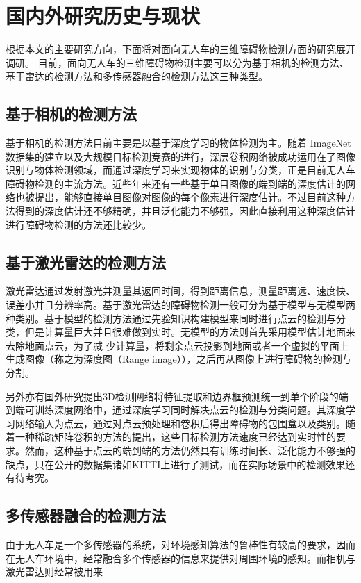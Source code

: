 \section{国内外研究历史与现状}
根据本文的主要研究方向，下面将对面向无人车的三维障碍物检测方面的研究展开调研。
目前，面向无人车的三维障碍物检测主要可以分为基于相机的检测方法、基于雷达的检测方法和多传感器融合的检测方法这三种类型。
\subsection{基于相机的检测方法}
基于相机的检测方法目前主要是以基于深度学习的物体检测为主。随着 ImageNet数据集的建立以及大规模目标检测竞赛的进行，深层卷积网络被成功运用在了图像识别与物体检测领域，而通过深度学习来实现物体的识别与分类，正是目前无人车障碍物检测的主流方法。近些年来还有一些基于单目图像的端到端的深度估计的网络也被提出，能够直接单目图像对图像的每个像素进行深度估计。不过目前这种方法得到的深度估计还不够精确，并且泛化能力不够强，因此直接利用这种深度估计进行障碍物检测的方法还比较少。
\subsection{基于激光雷达的检测方法}
激光雷达通过发射激光并测量其返回时间，得到距离信息，测量距离远、速度快、误差小并且分辨率高。基于激光雷达的障碍物检测一般可分为基于模型与无模型两种类别。基于模型的检测方法通过先验知识构建模型来同时进行点云的检测与分类，但是计算量巨大并且很难做到实时。无模型的方法则首先采用模型估计地面来去除地面点云，为了减 少计算量，将剩余点云投影到地面或者一个虚拟的平面上生成图像（称之为深度图（Range image）），之后再从图像上进行障碍物的检测与分割。

另外亦有国外研究提出3D检测网络将特征提取和边界框预测统一到单个阶段的端到端可训练深度网络中，通过深度学习同时解决点云的检测与分类问题。其深度学习网络输入为点云，通过对点云预处理和卷积后得出障碍物的包围盒以及类别。随着一种稀疏矩阵卷积的方法的提出，这些目标检测方法速度已经达到实时性的要求。然而，这种基于点云的端到端的方法仍然具有训练时间长、泛化能力不够强的缺点，只在公开的数据集诸如KITTI上进行了测试，而在实际场景中的检测效果还有待考究。

\subsection{多传感器融合的检测方法}
由于无人车是一个多传感器的系统，对环境感知算法的鲁棒性有较高的要求，因而在无人车环境中，经常融合多个传感器的信息来提供对周围环境的感知。而相机与激光雷达则经常被用来

